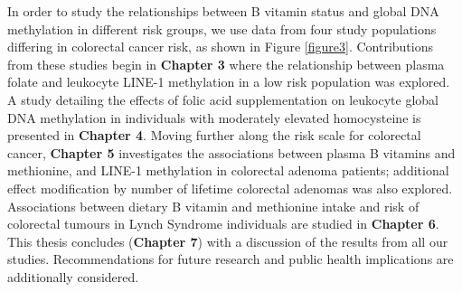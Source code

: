 \noindent In order to study the relationships between B vitamin status and global DNA methylation in different risk groups, we use data from four study populations differing in colorectal cancer risk, as shown in Figure \ref{figure3}. Contributions from these studies begin in \textbf{Chapter 3} where the relationship between plasma folate and leukocyte LINE-1 methylation in a low risk population was explored. A study detailing the effects of folic acid supplementation on leukocyte global DNA methylation in individuals with moderately elevated homocysteine is presented in \textbf{Chapter 4}. Moving further along the risk scale for colorectal cancer, \textbf{Chapter 5} investigates the associations between plasma B vitamins and methionine, and LINE-1 methylation in colorectal adenoma patients; additional effect modification by number of lifetime colorectal adenomas was also explored. Associations between dietary B vitamin and methionine intake and risk of colorectal tumours in Lynch Syndrome individuals are studied in \textbf{Chapter 6}. This thesis concludes (\textbf{Chapter 7}) with a discussion of the results from all our studies. Recommendations for future research and public health implications are additionally considered. 

